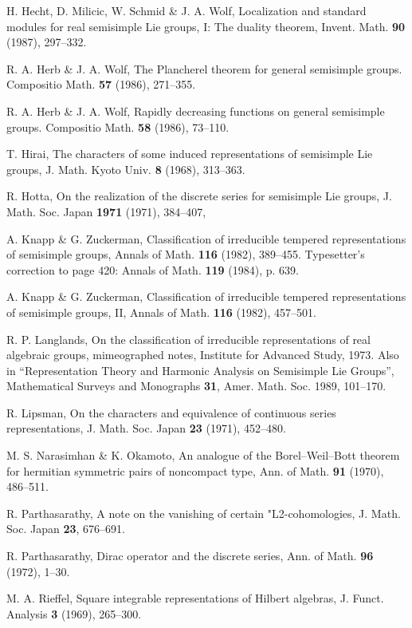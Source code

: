 \documentclass{conm-p-l}
\begin{document}
\begin{thebibliography}{XX}
H. Hecht, D. Milicic, W. Schmid \& J. A. Wolf,
Localization and standard modules for real semisimple Lie groups, I: 
The duality theorem, Invent. Math. {\bf 90} (1987), 297--332. 

R. A. Herb \& J. A. Wolf,
The Plancherel theorem for general semisimple groups.
Compositio Math. {\bf 57} (1986), 271--355.

R. A. Herb \& J. A. Wolf,
Rapidly decreasing functions on general semisimple groups.
Compositio Math. {\bf 58} (1986), 73--110.

T. Hirai,
The characters of some induced representations of semisimple Lie groups,
J. Math. Kyoto Univ. {\bf 8} (1968), 313--363.

R. Hotta, On the realization of the discrete series for semisimple Lie
groups, J. Math. Soc. Japan {\bf 1971} (1971), 384--407,

A. Knapp \& G. Zuckerman,
Classification of irreducible tempered representations of semisimple groups,
Annals of Math. {\bf 116} (1982), 389--455.
Typesetter's correction to page 420: Annals of Math. {\bf 119} (1984), 
p. 639.

A. Knapp \& G. Zuckerman,
Classification of irreducible tempered representations of semisimple groups,
II,  Annals of Math. {\bf 116} (1982), 457--501.

R. P. Langlands, 
On the classification of irreducible representations of real algebraic 
groups, mimeographed notes, Institute for Advanced Study, 1973.
Also in ``Representation Theory and Harmonic Analysis on Semisimple Lie
Groups'', Mathematical Surveys and Monographs {\bf 31}, Amer. Math.
Soc. 1989, 101--170.

R. Lipsman,
On the characters and equivalence of continuous series representations,
J. Math. Soc. Japan {\bf 23} (1971), 452--480.

M. S. Narasimhan \& K. Okamoto,
An analogue of the Borel--Weil--Bott theorem for hermitian symmetric pairs
of noncompact type, Ann. of Math. {\bf 91} (1970), 486--511.

R. Parthasarathy, A note on the vanishing of certain "L2-cohomologies,
J. Math. Soc. Japan {\bf 23}, 676--691.

R. Parthasarathy, Dirac operator and the discrete series, Ann. of Math.
{\bf 96} (1972), 1--30.

M. A. Rieffel,
Square integrable representations of Hilbert algebras,
J. Funct. Analysis {\bf 3} (1969), 265--300.


\end{thebibliography}
\end{document}
